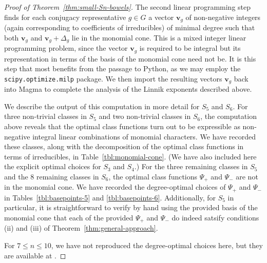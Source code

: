 \documentclass[12pt]{amsart}
\theoremstyle{definition} \newtheorem{definition}[theorem]{Definition}
\theoremstyle{example} \newtheorem{example}[theorem]{Example}
\theoremstyle{remark} \newtheorem{remark}{Remark}[theorem]
\numberwithin{equation}{section}
\numberwithin{theorem}{section}
\renewcommand{\leq}{\leqslant}
\begin{document}
\begin{proof}[Proof of Theorem~\ref{thm:small-Sn-bowels}]
		
		The second linear programming step finds for each conjugacy representative $g \in G$ a vector $\mathbf{v}_g$ of non-negative integers (again corresponding to coefficients of irreducibles) of minimal degree such that both $\mathbf{v}_g$ and $\mathbf{v}_g + \Delta_g$ lie in the monomial cone.  This is a mixed integer linear programming problem, since the vector $\mathbf{v}_g$ is required to be integral but its representation in terms of the basis of the monomial cone need not be.  It is this step that most benefits from the passage to Python, as we may employ the \verb^scipy.optimize.milp^ package.  We then import the resulting vectors $\mathbf{v}_g$ back into Magma to complete the analysis of the Linnik exponents described above.
		
		We describe the output of this computation in more detail for $S_5$ and $S_6$.  For three non-trivial classes in $S_5$ and two non-trivial classes in $S_6$, the computation above reveals that the optimal class functions turn out to be expressible as non-negative integral linear combinations of monomial characters.  We have recorded these classes, along with the decomposition of the optimal class functions in terms of irreducibles, in Table~\ref{tbl:monomial-cone}.  (We have also included here the explicit optimal choices for $S_3$ and $S_4$.)  For the three remaining classes in $S_5$ and the $8$ remaining classes in $S_6$, the optimal class functions $\Psi_+$ and $\Psi_-$ are not in the monomial cone.  We have recorded the degree-optimal choices of $\Psi_+$ and $\Psi_-$ in Tables~\ref{tbl:basepoints-5} and \ref{tbl:basepoints-6}.  Additionally, for $S_5$ in particular, it is straightforward to verify by hand using the provided basis of the monomial cone that each of the provided $\Psi_+$ and $\Psi_-$ do indeed satsify conditions (ii) and (iii) of Theorem~\ref{thm:general-approach}. 
		
		For $7 \leq n \leq 10$, we have not reproduced the degree-optimal choices here, but they are available at \cite{github}.
	\end{proof}
	
\end{document}
